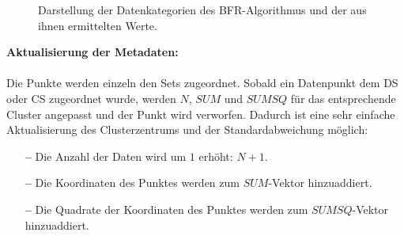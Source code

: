 \documentclass[a4paper,12pt,twoside]{article}
\begin{document}
\begin{figure}[!htb]
	\centering
	\hfill\null
	\caption{Darstellung der Datenkategorien des BFR-Algorithmus und der aus ihnen ermittelten Werte.
	}
	\label{fig:BFR}
\end{figure}
\newpage
\noindent
\textbf{Aktualisierung der Metadaten:} \\
\\
\noindent
Die Punkte werden einzeln den Sets zugeordnet. Sobald ein Datenpunkt dem DS oder CS zugeordnet wurde, werden $ N $, $ SUM $ und $ SUMSQ $ für das entsprechende Cluster angepasst und der Punkt wird verworfen. Dadurch ist eine sehr einfache Aktualisierung des Clusterzentrums und der Standardabweichung möglich:
\begin{itemize}
	\item[\textbf{--}] Die Anzahl der Daten wird um $ 1 $ erhöht: 
	$ N + 1 $.
	\item[\textbf{--}] Die Koordinaten des Punktes werden zum $ SUM $-Vektor hinzuaddiert.
	\item[\textbf{--}] Die Quadrate der Koordinaten des Punktes werden zum $ SUMSQ $-Vektor hinzuaddiert. 
\end{itemize}	
\end{document}
